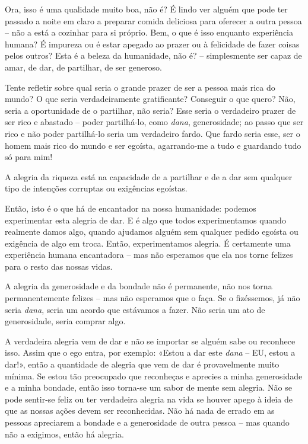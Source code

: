 Ora, isso é uma qualidade muito boa, não é? É lindo ver alguém que pode ter
passado a noite em claro a preparar comida deliciosa para oferecer a outra
pessoa -- não a está a cozinhar para si próprio. Bem, o que é isso enquanto
experiência humana? É impureza ou é estar apegado ao prazer ou à felicidade de
fazer coisas pelos outros? Esta é a beleza da humanidade, não é? -- simplesmente
ser capaz de amar, de dar, de partilhar, de ser generoso.

Tente refletir sobre qual seria o grande prazer de ser a pessoa mais rica do
mundo? O que seria verdadeiramente gratificante? Conseguir o que quero? Não,
seria a oportunidade de o partilhar, não seria? Esse seria o verdadeiro prazer
de ser rico e abastado -- poder partilhá-lo, como \emph{dana}, generosidade; ao
passo que ser rico e não poder partilhá-lo seria um verdadeiro fardo. Que fardo
seria esse, ser o homem mais rico do mundo e ser egoísta, agarrando-me a tudo e
guardando tudo só para mim!

A alegria da riqueza está na capacidade de a partilhar e de a dar sem qualquer
tipo de intenções corruptas ou exigências egoístas.

Então, isto é o que há de encantador na nossa humanidade: podemos experimentar
esta alegria de dar. E é algo que todos experimentamos quando realmente damos
algo, quando ajudamos alguém sem qualquer pedido egoísta ou exigência de algo em
troca. Então, experimentamos alegria. É certamente uma experiência humana
encantadora -- mas não esperamos que ela nos torne felizes para o resto das
nossas vidas.

A alegria da generosidade e da bondade não é permanente, não nos torna
permanentemente felizes -- mas não esperamos que o faça. Se o fizéssemos, já não
seria \emph{dana}, seria um acordo que estávamos a fazer. Não seria um ato de
generosidade, seria comprar algo.

A verdadeira alegria vem de dar e não se importar se alguém sabe ou reconhece
isso. Assim que o ego entra, por exemplo: «Estou a dar este \emph{dana} -- EU, estou a dar!»,
então a quantidade de alegria que vem de dar é provavelmente
muito mínima. Se estou tão preocupado que reconheças e aprecies a minha
generosidade e a minha bondade, então isso torna-se um sabor de mente sem
alegria. Não se pode sentir-se feliz ou ter verdadeira alegria na vida se
houver apego à ideia de que as nossas ações devem ser reconhecidas. Não há nada
de errado em as pessoas apreciarem a bondade e a generosidade de outra pessoa --
mas quando não a exigimos, então há alegria.

